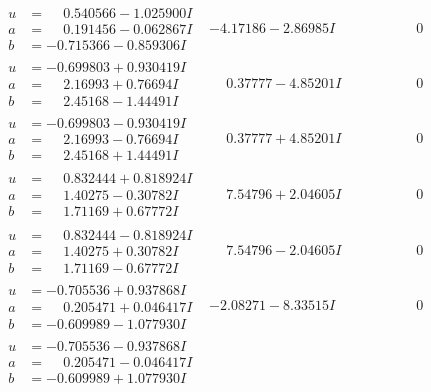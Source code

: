 \documentclass[1p]{elsarticle_modified}
\theoremstyle{definition}
\begin{document}
$$\begin{array}{c|c|c}
\begin{aligned}
u &= \phantom{-}0.540566 - 1.025900 I \\
a &= \phantom{-}0.191456 - 0.062867 I \\
b &= -0.715366 - 0.859306 I\end{aligned}
 & -4.17186 - 2.86985 I & \phantom{-0.000000 } 0 \\ \hline\begin{aligned}
u &= -0.699803 + 0.930419 I \\
a &= \phantom{-}2.16993 + 0.76694 I \\
b &= \phantom{-}2.45168 - 1.44491 I\end{aligned}
 & \phantom{-}0.37777 - 4.85201 I & \phantom{-0.000000 } 0 \\ \hline\begin{aligned}
u &= -0.699803 - 0.930419 I \\
a &= \phantom{-}2.16993 - 0.76694 I \\
b &= \phantom{-}2.45168 + 1.44491 I\end{aligned}
 & \phantom{-}0.37777 + 4.85201 I & \phantom{-0.000000 } 0 \\ \hline\begin{aligned}
u &= \phantom{-}0.832444 + 0.818924 I \\
a &= \phantom{-}1.40275 - 0.30782 I \\
b &= \phantom{-}1.71169 + 0.67772 I\end{aligned}
 & \phantom{-}7.54796 + 2.04605 I & \phantom{-0.000000 } 0 \\ \hline\begin{aligned}
u &= \phantom{-}0.832444 - 0.818924 I \\
a &= \phantom{-}1.40275 + 0.30782 I \\
b &= \phantom{-}1.71169 - 0.67772 I\end{aligned}
 & \phantom{-}7.54796 - 2.04605 I & \phantom{-0.000000 } 0 \\ \hline\begin{aligned}
u &= -0.705536 + 0.937868 I \\
a &= \phantom{-}0.205471 + 0.046417 I \\
b &= -0.609989 - 1.077930 I\end{aligned}
 & -2.08271 - 8.33515 I & \phantom{-0.000000 } 0 \\ \hline\begin{aligned}
u &= -0.705536 - 0.937868 I \\
a &= \phantom{-}0.205471 - 0.046417 I \\
b &= -0.609989 + 1.077930 I\end{aligned}

\end{array}$$
\end{document}
